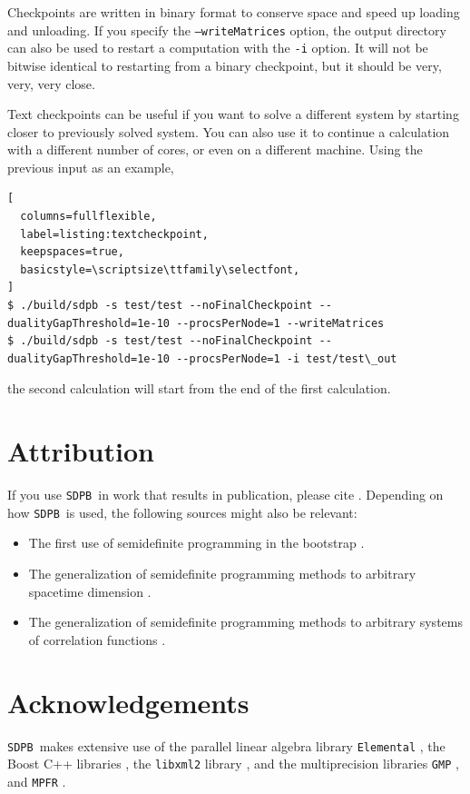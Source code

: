 \documentclass[12pt]{article}
\numberwithin{equation}{section}
\newcommand\SDPB{\texttt{SDPB}}
\begin{document}
Checkpoints are written in binary format to conserve space and speed
up loading and unloading.  If you specify the \texttt{--writeMatrices}
option, the output directory can also be used to restart a computation
with the \texttt{-i} option.  It will not be bitwise identical to
restarting from a binary checkpoint, but it should be very, very, very
close.

Text checkpoints can be useful if you want to solve a different system
by starting closer to previously solved system.  You can also use it
to continue a calculation with a different number of cores, or even on
a different machine.  Using the previous input as an example,

\begin{lstlisting}[
  columns=fullflexible,
  label=listing:textcheckpoint,
  keepspaces=true,
  basicstyle=\scriptsize\ttfamily\selectfont,
]
$ ./build/sdpb -s test/test --noFinalCheckpoint --dualityGapThreshold=1e-10 --procsPerNode=1 --writeMatrices
$ ./build/sdpb -s test/test --noFinalCheckpoint --dualityGapThreshold=1e-10 --procsPerNode=1 -i test/test\_out
\end{lstlisting}

the second calculation will start from the end of the first calculation.

\section{Attribution}

If you use \SDPB\ in work that results in publication, please cite \cite{DSD}. Depending on how \SDPB\ is used, the following sources might also be relevant:
\begin{itemize}
\item The first use of semidefinite programming in the bootstrap \cite{Poland:2011ey}.
\item The generalization of semidefinite programming methods to arbitrary
spacetime dimension \cite{Kos:2013tga}.
\item The generalization of semidefinite programming methods to arbitrary
systems of correlation functions \cite{Kos:2014bka}.
\end{itemize}

\section{Acknowledgements}

\SDPB\ makes extensive use of the parallel linear algebra library
\texttt{Elemental} \cite{Elemental}, the Boost C++
libraries \cite{BoostSite}, the \texttt{libxml2} library
\cite{libxml2}, and the multiprecision libraries \texttt{GMP}
\cite{GMP}, and \texttt{MPFR}
\cite{MPFR}.
\end{document}
